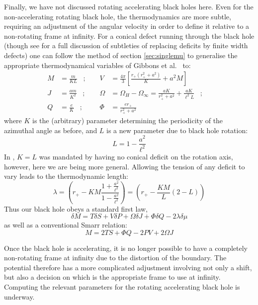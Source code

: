 \documentclass[
twoside,openright,frontopenright]{dmathesis}
\begin{document}
Finally, we have not discussed rotating accelerating black holes here. Even for
the non-accelerating rotating black hole, the thermodynamics are more subtle,
requiring an adjustment of the angular velocity \cite{Gibbons:2004ai} in order
to define it relative to a non-rotating frame at infinity. For a conical defect
running through the black hole (though see
\cite{Gregory:2013xca,Gregory:2014uca} for a full discussion of subtleties of
replacing deficits by finite width defects) one can follow the method of section
\ref{sec:singlemu} to generalise the appropriate thermodynamical variables of
Gibbons et al.\ \cite{Gibbons:2004ai} to:
\begin{equation}
  \begin{aligned}
M &= \frac{m}{KL} \;\;\;; \;\;\;\;&
V &= \frac{4\pi}{3} \left [ \frac{r_+(r_+^2+a^2)}{K} + a^2 M \right]\\
J &= \frac{am}{K^2} \;\;\;; \;\;\;\;&
\Omega &= \Omega_H-\Omega_\infty
= \frac{aK}{r_+^2+a^2} + \frac{aK}{\ell^2 L} \;\;\;; \;\;\;\;\\
Q &= \frac{e}{K} \;\;\;;\;\;\;\;& \Phi &= \frac{er_+}{r_+^2+a^2}
\end{aligned}
\end{equation}
where $K$ is the (arbitrary) parameter determining the periodicity of the
azimuthal angle as before, and $L$ is a new parameter due to black hole
rotation:
\begin{equation}
L = 1 - \frac{a^2}{\ell^2}
\end{equation}
In \cite{Gibbons:2004ai}, $K=L$ was mandated by having no conical deficit on the
rotation axis, however, here we are being more general. Allowing the tension of
any deficit to vary leads to the thermodynamic length:
\begin{equation}
\lambda = \left ( r_+ - KM \frac{1+\frac{a^2}{\ell^2}}{1-\frac{a^2}{\ell^2}} \right)
= \left ( r_+ - \frac{KM}{L}(2-L) \right)
\end{equation}
Thus our black hole obeys a standard first law, 
\begin{equation}
\delta M = T \delta S + V \delta P + \Omega \delta J + \Phi \delta Q
-2 \lambda \delta\mu
\end{equation}
as well as a conventional Smarr relation:
\begin{equation}
M
= 2TS + \Phi Q - 2 PV + 2 \Omega J
\end{equation}

Once the black hole is accelerating, it is no longer possible to have a
completely non-rotating frame at infinity due to the distortion of the
boundary. The potential therefore has a more complicated adjustment involving
not only a shift, but also a decision on which is the appropriate frame to use
at infinity. Computing the relevant parameters for the rotating accelerating
black hole is underway.
\end{document}
